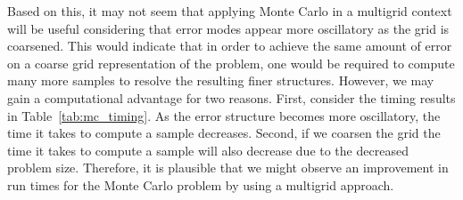 \documentclass[note]{TechNote}
\begin{document}
Based on this, it may not seem that applying Monte Carlo in a
multigrid context will be useful considering that error modes appear
more oscillatory as the grid is coarsened. This would indicate that in
order to achieve the same amount of error on a coarse grid
representation of the problem, one would be required to compute many
more samples to resolve the resulting finer structures. However, we
may gain a computational advantage for two reasons. First, consider
the timing results in Table~\ref{tab:mc_timing}. As the error
structure becomes more oscillatory, the time it takes to compute a
sample decreases. Second, if we coarsen the grid the time it takes to
compute a sample will also decrease due to the decreased problem
size. Therefore, it is plausible that we might observe an improvement
in run times for the Monte Carlo problem by using a multigrid
approach.

\end{document}

